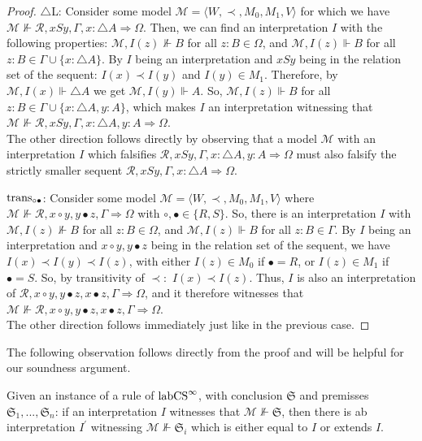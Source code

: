 \documentclass[runningheads,orivec]{llncs}
\newcommand{\labCS}{{\textnormal{labCS}^\infty}}
\newcommand{\transBi}{\textnormal{trans}_{\circ \bullet}}
\newcommand{\Ra}{\Rightarrow}
\newcommand{\la}{\langle}
\newcommand{\ra}{\rangle}
\newcommand{\R}{\mathcal{R}}
\newcommand{\Mw}{\mathcal{M}}
\newcommand{\Seq}{\mathfrak{S}}
\begin{document}
\begin{proof}
    \sloppy
    $\triangle$L: Consider some model $\Mw = \la W , \prec , M_0 , M_1, V \ra$ for which we have ${\Mw \nVdash \R , xS y , \Gamma, x : \triangle A \Ra \Omega}$. Then, we can find an interpretation $I$ with the following properties: $\Mw , I(z) \nVdash B$ for all ${z : B \in \Omega}$, and ${\Mw , I(z) \Vdash B}$ for all ${z : B \in \Gamma \cup \{ x : \triangle A \}}$. By $I$ being an interpretation and $xS y$ being in the relation set of the sequent: $I(x) \prec I(y)$ and $I(y) \in M_1$. Therefore, by $\Mw , I(x) \Vdash \triangle A$ we get $ \Mw , I(y) \Vdash A$. So, $\Mw , I(z) \Vdash B$ for all $z : B \in \Gamma \cup \{x : \triangle A , y : A \}$, which makes $I$ an interpretation witnessing that $\Mw \nVdash \R , xS y , \Gamma ,x : \triangle A , y : A \Ra \Omega$. \\
    The other direction follows directly by observing that a model $\Mw$ with an interpretation $I$ which falsifies $\R , xS y , \Gamma, x : \triangle A , y :A \Ra \Omega$ must also falsify the strictly smaller sequent $\R , xS y , \Gamma, x : \triangle A \Ra \Omega$.

    \sloppy
    $\transBi$: Consider some model $\Mw = \la W , \prec , M_0 , M_1 , V \ra$ where ${\Mw \nVdash \R , x \circ y , y \bullet z , \Gamma \Ra \Omega}$ with $\circ , \bullet \in \{R,S\}$. So, there is an interpretation $I$ with $\Mw , I(z) \nVdash B$ for all $z : B \in \Omega$, and $\Mw , I(z) \Vdash B$ for all $z : B \in \Gamma$. By $I$ being an interpretation and $x \circ y , y \bullet z$ being in the relation set of the sequent, we have $I(x) \prec I(y) \prec I(z)$, with either $I(z) \in M_0$ if $\bullet = R$, or $I(z) \in M_1$ if $\bullet = S$. So, by transitivity of ${\prec}:$ $I(x) \prec I(z)$. Thus, $I$ is also an interpretation of $\R , x \circ y , y \bullet z , x \bullet z ,\Gamma \Ra \Omega$, and it therefore witnesses that $\Mw \nVdash \R ,  x \circ y , y \bullet z , x \bullet z ,\Gamma \Ra \Omega$. \\
    The other direction follows immediately just like in the previous case.
\end{proof}

The following observation follows directly from the proof and will be helpful for our soundness argument.

\begin{corollary} \label{cor:interpretation}
    Given an instance of a rule of $\labCS$, with conclusion $\Seq$ and premisses $\Seq_1 , ... , \Seq_n$: if an interpretation $I$ witnesses that $\Mw \nVdash \Seq$, then there is ab interpretation $I^\prime$ witnessing $\Mw \nVdash \Seq_i$ which is either equal to $I$ or extends $I$.
\end{corollary}
\end{document}
